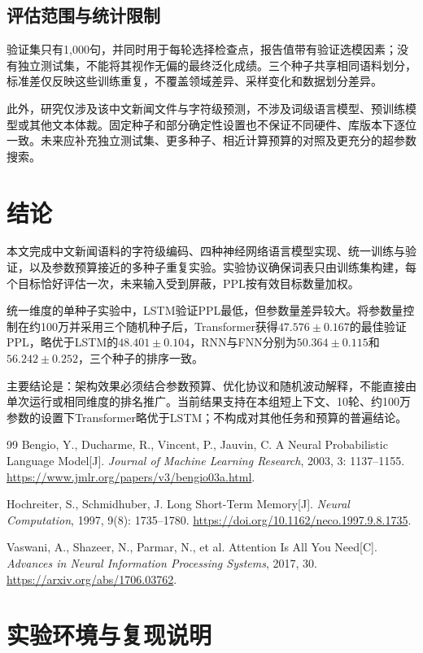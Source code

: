 ﻿\documentclass[UTF8,a4paper,12pt]{ctexart}
\begin{document}
\subsection{评估范围与统计限制}
验证集只有1,000句，并同时用于每轮选择检查点，报告值带有验证选模因素；没有独立测试集，不能将其视作无偏的最终泛化成绩。三个种子共享相同语料划分，标准差仅反映这些训练重复，不覆盖领域差异、采样变化和数据划分差异。

此外，研究仅涉及该中文新闻文件与字符级预测，不涉及词级语言模型、预训练模型或其他文本体裁。固定种子和部分确定性设置也不保证不同硬件、库版本下逐位一致。未来应补充独立测试集、更多种子、相近计算预算的对照及更充分的超参数搜索。

\section{结论}
本文完成中文新闻语料的字符级编码、四种神经网络语言模型实现、统一训练与验证，以及参数预算接近的多种子重复实验。实验协议确保词表只由训练集构建，每个目标恰好评估一次，未来输入受到屏蔽，PPL按有效目标数量加权。

统一维度的单种子实验中，LSTM验证PPL最低，但参数量差异较大。将参数量控制在约100万并采用三个随机种子后，Transformer获得$47.576\pm0.167$的最佳验证PPL，略优于LSTM的$48.401\pm0.104$，RNN与FNN分别为$50.364\pm0.115$和$56.242\pm0.252$，三个种子的排序一致。

主要结论是：架构效果必须结合参数预算、优化协议和随机波动解释，不能直接由单次运行或相同维度的排名推广。当前结果支持在本组短上下文、10轮、约100万参数的设置下Transformer略优于LSTM；不构成对其他任务和预算的普遍结论。

\begin{thebibliography}{99}
Bengio, Y., Ducharme, R., Vincent, P., Jauvin, C.
A Neural Probabilistic Language Model[J].
\textit{Journal of Machine Learning Research}, 2003, 3: 1137--1155.
\url{https://www.jmlr.org/papers/v3/bengio03a.html}.

Hochreiter, S., Schmidhuber, J.
Long Short-Term Memory[J].
\textit{Neural Computation}, 1997, 9(8): 1735--1780.
\url{https://doi.org/10.1162/neco.1997.9.8.1735}.

Vaswani, A., Shazeer, N., Parmar, N., et al.
Attention Is All You Need[C].
\textit{Advances in Neural Information Processing Systems}, 2017, 30.
\url{https://arxiv.org/abs/1706.03762}.
\end{thebibliography}

\appendix
\section{实验环境与复现说明}
\end{document}
